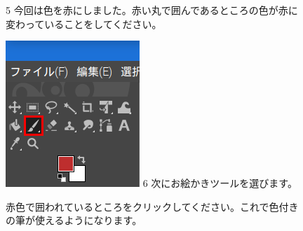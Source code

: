 \begin{figure}[ht]
  \begin{minipage}{0.4\textwidth}
    5 今回は色を赤にしました。赤い丸で囲んであるところの色が赤に変わっていることをしてください。
  \end{minipage}
  \hspace{2cm}
  \begin{minipage}{0.4\textwidth}
    \includegraphics[width=\linewidth]{text01-img/textbook-img127.png}
    6 次にお絵かきツールを選びます。

    赤色で囲われているところをクリックしてください。これで色付きの筆が使えるようになります。

  \end{minipage}
\end{figure}
\clearpage


